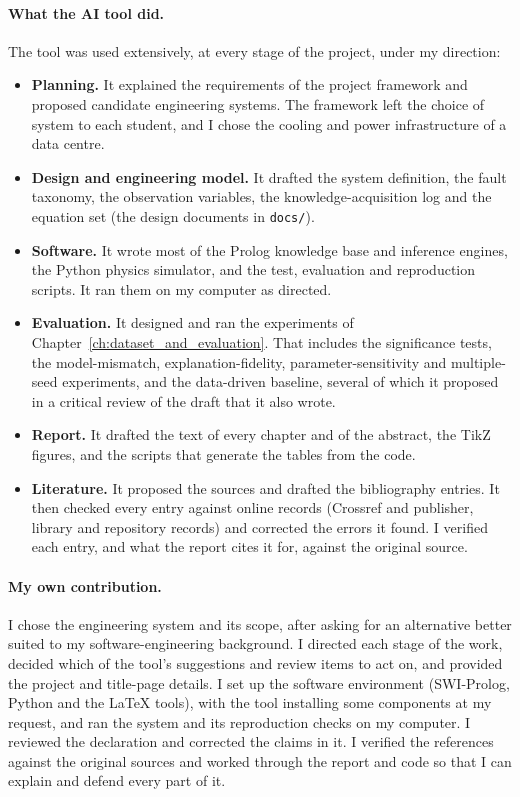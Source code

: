 \paragraph{What the AI tool did.} The tool was used extensively, at every stage of the project, under my direction:
\begin{itemize}
  \item \textbf{Planning.} It explained the requirements of the project framework and proposed candidate engineering systems. The framework left the choice of system to each student, and I chose the cooling and power infrastructure of a data centre.
  \item \textbf{Design and engineering model.} It drafted the system definition, the fault taxonomy, the observation variables, the knowledge-acquisition log and the equation set (the design documents in \texttt{docs/}).
  \item \textbf{Software.} It wrote most of the Prolog knowledge base and inference engines, the Python physics simulator, and the test, evaluation and reproduction scripts. It ran them on my computer as directed.
  \item \textbf{Evaluation.} It designed and ran the experiments of Chapter~\ref{ch:dataset_and_evaluation}. That includes the significance tests, the model-mismatch, explanation-fidelity, parameter-sensitivity and multiple-seed experiments, and the data-driven baseline, several of which it proposed in a critical review of the draft that it also wrote.
  \item \textbf{Report.} It drafted the text of every chapter and of the abstract, the TikZ figures, and the scripts that generate the tables from the code.
  \item \textbf{Literature.} It proposed the sources and drafted the bibliography entries. It then checked every entry against online records (Crossref and publisher, library and repository records) and corrected the errors it found. I verified each entry, and what the report cites it for, against the original source.
\end{itemize}
\paragraph{My own contribution.} I chose the engineering system and its scope, after asking for an alternative better suited to my software-engineering background. I directed each stage of the work, decided which of the tool's suggestions and review items to act on, and provided the project and title-page details. I set up the software environment (SWI-Prolog, Python and the LaTeX tools), with the tool installing some components at my request, and ran the system and its reproduction checks on my computer. I reviewed the declaration and corrected the claims in it. I verified the references against the original sources and worked through the report and code so that I can explain and defend every part of it.

